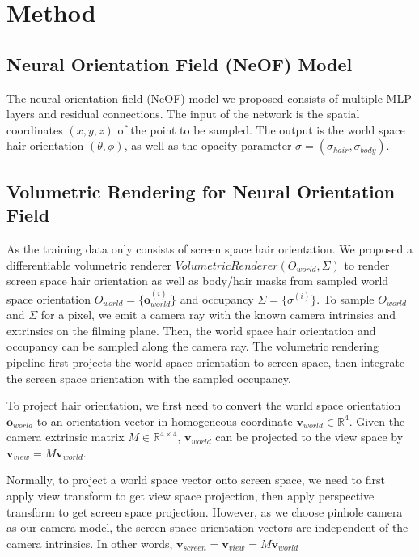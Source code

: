\documentclass{article}
\begin{document}
\section{Method}


\subsection{Neural Orientation Field (NeOF) Model}

The neural orientation field (NeOF) model we proposed consists of multiple MLP layers and residual connections. The input of the network is the spatial coordinates $(x, y, z)$ of the point to be sampled. The output is the world space hair orientation $(\theta, \phi)$, as well as the opacity parameter $\sigma = (\sigma_{hair}, \sigma_{body})$.

\subsection{Volumetric Rendering for Neural Orientation Field}

As the training data only consists of screen space hair orientation. We proposed a differentiable volumetric renderer $VolumetricRenderer(O_{world}, \Sigma)$ to render screen space hair orientation as well as body/hair masks from sampled world space orientation $O_{world} = \{ \mathbf{o}_{world}^{(i)} \}$ and occupancy $\Sigma = \{ \sigma^{(i)} \}$. To sample $O_{world}$ and $\Sigma$ for a pixel, we emit a camera ray with the known camera intrinsics and extrinsics on the filming plane. Then, the world space hair orientation and occupancy can be sampled along the camera ray. The volumetric rendering pipeline first projects the world space orientation to screen space, then integrate the screen space orientation with the sampled occupancy.

To project hair orientation, we first need to convert the world space orientation $\mathbf{o}_{world}$ to an orientation vector in homogeneous coordinate $\mathbf{v}_{world} \in \mathbb{R}^{4}$. Given the camera extrinsic matrix $M \in \mathbb{R}^{4 \times 4}$, $\mathbf{v}_{world}$ can be projected to the view space by $\mathbf{v}_{view} = M\mathbf{v}_{world}$.

Normally, to project a world space vector onto screen space, we need to first apply view transform to get view space projection, then apply perspective transform to get screen space projection. However, as we choose pinhole camera as our camera model, the screen space orientation vectors are independent of the camera intrinsics. In other words, $\mathbf{v}_{screen} = \mathbf{v}_{view} = M\mathbf{v}_{world}$
\end{document}
